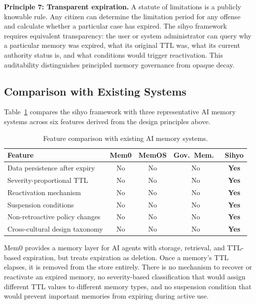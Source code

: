 \documentclass[12pt]{article}
\begin{document}
\textbf{Principle 7: Transparent expiration.} A statute of limitations is a publicly knowable rule. Any citizen can determine the limitation period for any offense and calculate whether a particular case has expired. The sihyo framework requires equivalent transparency: the user or system administrator can query why a particular memory was expired, what its original TTL was, what its current authority status is, and what conditions would trigger reactivation. This auditability distinguishes principled memory governance from opaque decay.

\subsection{Comparison with Existing Systems}
\label{sec:comparison}

Table~\ref{tab:comparison} compares the sihyo framework with three representative AI memory systems across six features derived from the design principles above.

\begin{table}[ht]
\centering
\caption{Feature comparison with existing AI memory systems.}
\label{tab:comparison}
\begin{tabular}{@{}lcccc@{}}
\toprule
Feature & Mem0 & MemOS & Gov.\ Mem.\ & Sihyo \\
\midrule
Data persistence after expiry & No & No & No & \textbf{Yes} \\
Severity-proportional TTL & No & No & No & \textbf{Yes} \\
Reactivation mechanism & No & No & No & \textbf{Yes} \\
Suspension conditions & No & No & No & \textbf{Yes} \\
Non-retroactive policy changes & No & No & No & \textbf{Yes} \\
Cross-cultural design taxonomy & No & No & No & \textbf{Yes} \\
\bottomrule
\end{tabular}
\end{table}

Mem0 \citep{mem0-2025} provides a memory layer for AI agents with storage, retrieval, and TTL-based expiration, but treats expiration as deletion. Once a memory's TTL elapses, it is removed from the store entirely. There is no mechanism to recover or reactivate an expired memory, no severity-based classification that would assign different TTL values to different memory types, and no suspension condition that would prevent important memories from expiring during active use.
\end{document}
